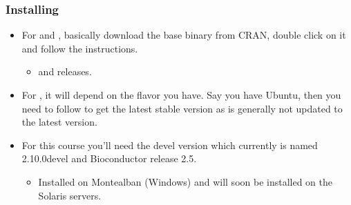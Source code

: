 \begin{frame}[allowframebreaks]
  \frametitle{Installing }
  \begin{itemize}
  \item For  and , basically download the base binary from CRAN, double click on it and follow the instructions.
  \begin{itemize}
  \item {} and  releases.
  \end{itemize}
  \item For , it will depend on the flavor you have. Say you have Ubuntu, then you need to follow  to get the latest stable version as  is generally not updated to the latest version.
  \item For this course you'll need the  devel version which currently is named 2.10.0devel and Bioconductor release 2.5.
  \begin{itemize}
  \item Installed on Montealban (Windows) and will soon be installed on the Solaris servers.
  \end{itemize}
  \end{itemize}
\end{frame}


